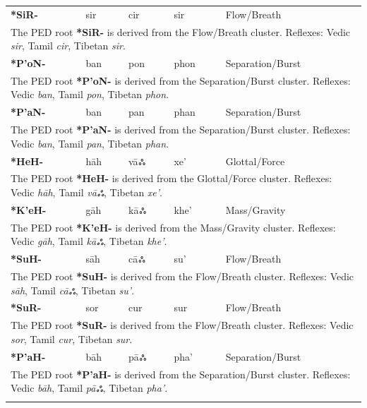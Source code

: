 \begin{longtable}{p{} p{} p{} p{} p{}}
\textbf{*SiR-} & sir & cir & sir & Flow/Breath \\ 
\multicolumn{5}{p{\textwidth}}{\small The PED root \textbf{*SiR-} is derived from the Flow/Breath cluster. Reflexes: Vedic \textit{sir}, Tamil \textit{cir}, Tibetan \textit{sir}. } \\ \addlinespace 
\textbf{*P'oN-} & ban & pon & phon & Separation/Burst \\ 
\multicolumn{5}{p{\textwidth}}{\small The PED root \textbf{*P'oN-} is derived from the Separation/Burst cluster. Reflexes: Vedic \textit{ban}, Tamil \textit{pon}, Tibetan \textit{phon}. } \\ \addlinespace 
\textbf{*P'aN-} & ban & pan & phan & Separation/Burst \\ 
\multicolumn{5}{p{\textwidth}}{\small The PED root \textbf{*P'aN-} is derived from the Separation/Burst cluster. Reflexes: Vedic \textit{ban}, Tamil \textit{pan}, Tibetan \textit{phan}. } \\ \addlinespace 
\textbf{*HeH-} & hāh & vāஃ & xe' & Glottal/Force \\ 
\multicolumn{5}{p{\textwidth}}{\small The PED root \textbf{*HeH-} is derived from the Glottal/Force cluster. Reflexes: Vedic \textit{hāh}, Tamil \textit{vāஃ}, Tibetan \textit{xe'}. } \\ \addlinespace 
\textbf{*K'eH-} & gāh & kāஃ & khe' & Mass/Gravity \\ 
\multicolumn{5}{p{\textwidth}}{\small The PED root \textbf{*K'eH-} is derived from the Mass/Gravity cluster. Reflexes: Vedic \textit{gāh}, Tamil \textit{kāஃ}, Tibetan \textit{khe'}. } \\ \addlinespace 
\textbf{*SuH-} & sāh & cāஃ & su' & Flow/Breath \\ 
\multicolumn{5}{p{\textwidth}}{\small The PED root \textbf{*SuH-} is derived from the Flow/Breath cluster. Reflexes: Vedic \textit{sāh}, Tamil \textit{cāஃ}, Tibetan \textit{su'}. } \\ \addlinespace 
\textbf{*SuR-} & sor & cur & sur & Flow/Breath \\ 
\multicolumn{5}{p{\textwidth}}{\small The PED root \textbf{*SuR-} is derived from the Flow/Breath cluster. Reflexes: Vedic \textit{sor}, Tamil \textit{cur}, Tibetan \textit{sur}. } \\ \addlinespace 
\textbf{*P'aH-} & bāh & pāஃ & pha' & Separation/Burst \\ 
\multicolumn{5}{p{\textwidth}}{\small The PED root \textbf{*P'aH-} is derived from the Separation/Burst cluster. Reflexes: Vedic \textit{bāh}, Tamil \textit{pāஃ}, Tibetan \textit{pha'}. } \\ \addlinespace 

\end{longtable}
